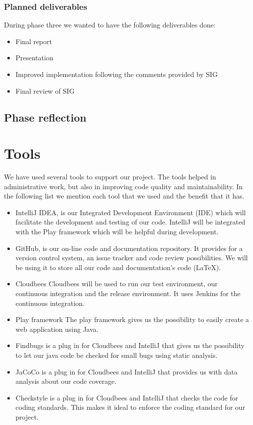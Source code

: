 \subsubsection{Planned deliverables}
During phase three we wanted to have the following deliverables done:
\begin{itemize}
\item Final report
\item Presentation
\item Improved implementation following the comments provided by SIG
\item Final review of SIG
\end{itemize}

\subsection{Phase reflection}

\section{Tools}
We have used several tools to support our project.
The tools helped in administrative work, but also in improving code quality and maintainability.
In the following list we mention each tool that we used and the benefit that it has.

\begin{itemize}
\item IntelliJ IDEA, is our Integrated Development Environment (IDE) which will facilitate the development and testing of our code.
IntelliJ will be integrated with the Play framework which will be helpful during development.
\item GitHub, is our on-line code and documentation repository.
It provides for a version control system, an issue tracker and code review possibilities.
We will be using it to store all our code and documentation's code (LaTeX).
\item Cloudbees
Cloudbees will be used to run our test environment, our continuous integration and the release environment.
It uses Jenkins for the continuous integration.
\item Play framework
The play framework gives us the possibility to easily create a web application using Java.
\item Findbugs is a plug in for Cloudbees and IntelliJ that gives us the possibility to let our java code be checked for small bugs using static analysis.
\item JaCoCo is a plug in for Cloudbees and IntelliJ that provides us with data analysis about our code coverage.
\item Checkstyle is a plug in for Cloudbees and IntelliJ that checks the code for coding standards.
This makes it ideal to enforce the coding standard for our project.
\end{itemize}
